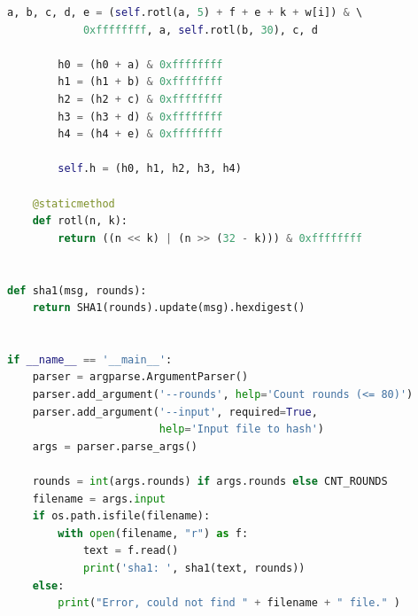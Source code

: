 \documentclass[12pt]{article}
\begin{document}
\begin{lstlisting}[language=Python]
            a, b, c, d, e = (self.rotl(a, 5) + f + e + k + w[i]) & \ 
            0xffffffff, a, self.rotl(b, 30), c, d

        h0 = (h0 + a) & 0xffffffff
        h1 = (h1 + b) & 0xffffffff
        h2 = (h2 + c) & 0xffffffff
        h3 = (h3 + d) & 0xffffffff
        h4 = (h4 + e) & 0xffffffff

        self.h = (h0, h1, h2, h3, h4)

    @staticmethod
    def rotl(n, k):
        return ((n << k) | (n >> (32 - k))) & 0xffffffff


def sha1(msg, rounds):
    return SHA1(rounds).update(msg).hexdigest()


if __name__ == '__main__':
    parser = argparse.ArgumentParser()
    parser.add_argument('--rounds', help='Count rounds (<= 80)')
    parser.add_argument('--input', required=True, 
                        help='Input file to hash')
    args = parser.parse_args()

    rounds = int(args.rounds) if args.rounds else CNT_ROUNDS
    filename = args.input
    if os.path.isfile(filename):
        with open(filename, "r") as f:
            text = f.read()
            print('sha1: ', sha1(text, rounds))
    else:
        print("Error, could not find " + filename + " file." )

\end{lstlisting}
\end{document}
